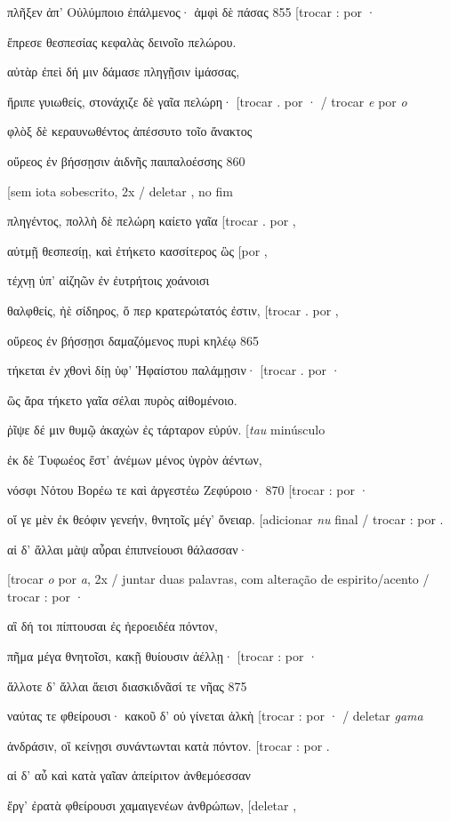 πλῆξεν ἀπ' Οὐλύμποιο ἐπάλμενος· ἀμφὶ δὲ πάσας 855 {[}trocar : por ·

ἔπρεσε θεσπεσίας κεφαλὰς δεινοῖο πελώρου.

αὐτὰρ ἐπεὶ δή μιν δάμασε πληγῇσιν ἱμάσσας,

ἤριπε γυιωθείς, στονάχιζε δὲ γαῖα πελώρη· {[}trocar . por · / trocar
\emph{e} por \emph{o}

φλὸξ δὲ κεραυνωθέντος ἀπέσσυτο τοῖο ἄνακτος

οὔρεος ἐν βήσσῃσιν ἀιδνῆς παιπαλοέσσης 860

{[}sem iota sobescrito, 2x / deletar , no fim

πληγέντος, πολλὴ δὲ πελώρη καίετο γαῖα {[}trocar . por ,

αὐτμῇ θεσπεσίῃ, καὶ ἐτήκετο κασσίτερος ὣς {[}por ,

τέχνῃ ὑπ' αἰζηῶν ἐν ἐυτρήτοις χοάνοισι

θαλφθείς, ἠὲ σίδηρος, ὅ περ κρατερώτατός ἐστιν, {[}trocar . por ,

οὔρεος ἐν βήσσῃσι δαμαζόμενος πυρὶ κηλέῳ 865

τήκεται ἐν χθονὶ δίῃ ὑφ' Ἡφαίστου παλάμῃσιν· {[}trocar . por ·

ὣς ἄρα τήκετο γαῖα σέλαι πυρὸς αἰθομένοιο.

ῥῖψε δέ μιν θυμῷ ἀκαχὼν ἐς τάρταρον εὐρύν. {[}\emph{tau} minúsculo

ἐκ δὲ Τυφωέος ἔστ' ἀνέμων μένος ὑγρὸν ἀέντων,

νόσφι Νότου Βορέω τε καὶ ἀργεστέω Ζεφύροιο· 870 {[}trocar : por ·

οἵ γε μὲν ἐκ θεόφιν γενεήν, θνητοῖς μέγ' ὄνειαρ. {[}adicionar \emph{nu}
final / trocar : por .

αἱ δ' ἄλλαι μὰψ αὖραι ἐπιπνείουσι θάλασσαν·

{[}trocar \emph{o} por \emph{a}, 2x / juntar duas palavras, com
alteração de espirito/acento / trocar : por ·

αἳ δή τοι πίπτουσαι ἐς ἠεροειδέα πόντον,

πῆμα μέγα θνητοῖσι, κακῇ θυίουσιν ἀέλλῃ· {[}trocar : por ·

ἄλλοτε δ' ἄλλαι ἄεισι διασκιδνᾶσί τε νῆας 875

ναύτας τε φθείρουσι· κακοῦ δ' οὐ γίνεται ἀλκὴ {[}trocar : por · /
deletar \emph{gama}

ἀνδράσιν, οἳ κείνῃσι συνάντωνται κατὰ πόντον. {[}trocar : por .

αἱ δ' αὖ καὶ κατὰ γαῖαν ἀπείριτον ἀνθεμόεσσαν

ἔργ' ἐρατὰ φθείρουσι χαμαιγενέων ἀνθρώπων, {[}deletar ,

